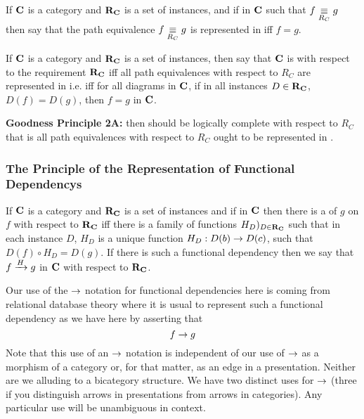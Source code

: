 \begin{definition}
If $\catc$ is a  category and $\reqtc$ is a set of instances,
 and if \fgparalleldiag in $\catc$ such that $f \pequiv g$
 then say that the path equivalence $f \pequiv g$ is represented in \catcw iff
 $f=g$.
\end{definition}

\begin{oldtt}
\begin{definition}
If $\catc$ is a  category and $\reqtc$ is a set of instances,
 then say that  $\catc$ is  with respect 
to the requirement $\reqtc$ iff all path equivalences with respect to $R_C$ are represented in \catcw 
i.e. iff for all diagrams \fgparalleldiag in $\catc$,  
if in all instances $D \in \reqtc$, $D(f)=D(g)$,  then $f=g$ in $\catc$.
\end{definition}
\end{oldtt}

\textbf{Goodness Principle 2A:} \IfSforCwithRCwords then \catc should be logically complete
with respect to $R_C$ that is all path equivalences with respect to $R_C$  ought to be represented in \catc.

\subsubsection{The Principle of the Representation of Functional Dependencys}

\begin{definition}
If $\catc$ is a category and $\reqtc$ is a set of instances and if \fgsourcediag
in $\catc$ then there is a   of $g$ on $f$ with respect to $\reqtc$ iff
there is a family of functions $H_D)_{D \in \reqtc}$ such that 
in each instance $D$, $H_D$ is a unique function $H_D: D(b) \morph D(c)$, such that $D(f) \circ H_D = D(g)$. 
If there is such a functional dependency then we say that $\fundep{H}{f}{g}$ in $\catc$ with respect to $\reqtc$.
\end{definition}

Our use of the $\morph$ notation for functional dependencies here is coming from relational database theory where it is usual to represent such a functional dependency as we have here by asserting that 
$$
f \morph g
$$
Note that this use of an $\morph$ notation is independent of our use of $\morph$ as a morphism of a category 
or, for that matter, as an edge in a presentation. Neither are we alluding to a bicategory structure. We have two distinct uses for $\morph$ (three if you distinguish arrows in presentations from arrows in categories). Any particular use will be unambiguous in context.

